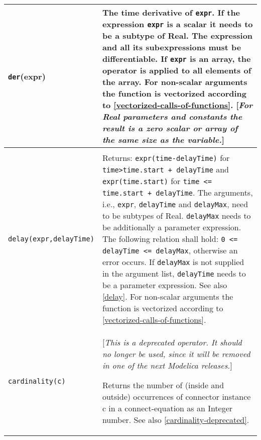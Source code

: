 \begin{longtable}{|p{5.1cm}|p{8cm}|} 
\hline \endhead

\lstinline[basicstyle=\ttfamily]!der!(expr) & 
The time derivative of \lstinline[basicstyle=\ttfamily]!expr!. If the expression \lstinline[basicstyle=\ttfamily]!expr! is a
scalar it needs to be a subtype of Real. The expression and all its
subexpressions must be differentiable. If \lstinline[basicstyle=\ttfamily]!expr! is an array, the operator
is applied to all elements of the array. For non-scalar arguments the
function is vectorized according to \autoref{vectorized-calls-of-functions}. {[}\emph{For Real
parameters and constants the result is a zero scalar or array of the
same size as the variable.}{]}\\ 
\hline

\begin{tabular}{@{}p{5.1cm}@{}}

\lstinline[basicstyle=\ttfamily]!delay(expr,delayTime,delayMax)!\\
\lstinline[basicstyle=\ttfamily]!delay(expr,delayTime)!
\end{tabular} & 
Returns: \lstinline[basicstyle=\ttfamily]!expr(time-delayTime)! for \lstinline[basicstyle=\ttfamily]!time>time.start + delayTime! and \lstinline[basicstyle=\ttfamily]!expr(time.start)! for \lstinline[basicstyle=\ttfamily]!time <= time.start + delayTime!. The arguments, i.e., \lstinline[basicstyle=\ttfamily]!expr!, \lstinline[basicstyle=\ttfamily]!delayTime! and \lstinline[basicstyle=\ttfamily]!delayMax!, need to be
subtypes of Real. \lstinline[basicstyle=\ttfamily]!delayMax! needs to be additionally a parameter
expression. The following relation shall hold: \lstinline[basicstyle=\ttfamily]!0 <= delayTime <= delayMax!, otherwise an error occurs. If \lstinline[basicstyle=\ttfamily]!delayMax! is not
supplied in the argument list, \lstinline[basicstyle=\ttfamily]!delayTime! needs to be a parameter
expression. See also \autoref{delay}. For non-scalar arguments the
function is vectorized according to \autoref{vectorized-calls-of-functions}.\\
\hline

\lstinline[basicstyle=\ttfamily]!cardinality(c)! & {[}\emph{This is a deprecated operator. It should no longer be used,
since it will be removed in one of the next Modelica releases.}{]}

Returns the number of (inside and outside) occurrences of connector
instance c in a connect-equation as an Integer number. See also \autoref{cardinality-deprecated}.\\ 
\hline


\end{longtable}
